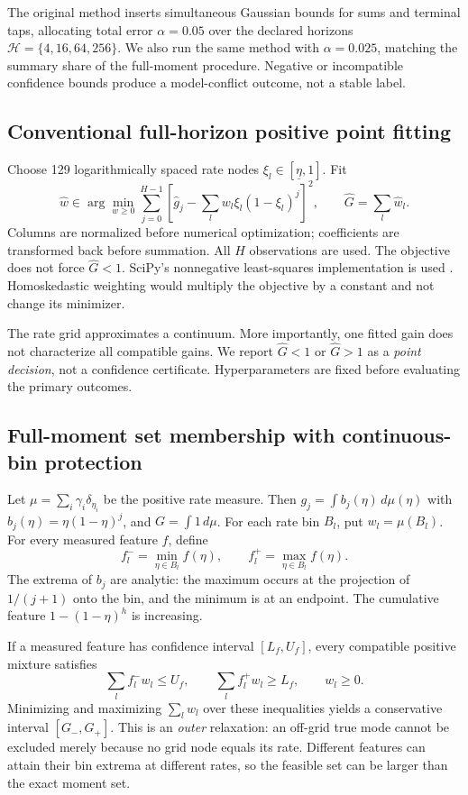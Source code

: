\documentclass[11pt]{article}
\theoremstyle{remark}\newtheorem{remark}[proposition]{Remark}
\begin{document}
The original method inserts simultaneous Gaussian bounds for sums and terminal taps, allocating total error $\alpha=0.05$ over the declared horizons $\mathcal H=\{4,16,64,256\}$. We also run the same method with $\alpha=0.025$, matching the summary share of the full-moment procedure. Negative or incompatible confidence bounds produce a model-conflict outcome, not a stable label.

\subsection{Conventional full-horizon positive point fitting}
Choose 129 logarithmically spaced rate nodes $\xi_l\in[\underline\eta,1]$. Fit
\begin{equation}
 \hat w\in\arg\min_{w\ge0}\sum_{j=0}^{H-1}\left[\hat g_j-\sum_lw_l\xi_l(1-\xi_l)^j\right]^2,\qquad\hat G=\sum_l\hat w_l.\label{eq:nnls}
\end{equation}
Columns are normalized before numerical optimization; coefficients are transformed back before summation. All $H$ observations are used. The objective does not force $\hat G<1$. SciPy's nonnegative least-squares implementation is used \citep{scipy_nnls}. Homoskedastic weighting would multiply the objective by a constant and not change its minimizer.

The rate grid approximates a continuum. More importantly, one fitted gain does not characterize all compatible gains. We report $\hat G<1$ or $\hat G>1$ as a \emph{point decision}, not a confidence certificate. Hyperparameters are fixed before evaluating the primary outcomes.

\subsection{Full-moment set membership with continuous-bin protection}
Let $\mu=\sum_i\gamma_i\delta_{\eta_i}$ be the positive rate measure. Then $g_j=\int b_j(\eta)\,d\mu(\eta)$ with $b_j(\eta)=\eta(1-\eta)^j$, and $G=\int1\,d\mu$. For each rate bin $B_l$, put $w_l=\mu(B_l)$. For every measured feature $f$, define
\begin{equation}
 f_l^- =\min_{\eta\in B_l}f(\eta),\qquad f_l^+=\max_{\eta\in B_l}f(\eta).
\end{equation}
The extrema of $b_j$ are analytic: the maximum occurs at the projection of $1/(j+1)$ onto the bin, and the minimum is at an endpoint. The cumulative feature $1-(1-\eta)^h$ is increasing.

If a measured feature has confidence interval $[L_f,U_f]$, every compatible positive mixture satisfies
\begin{equation}
 \sum_lf_l^-w_l\le U_f,\qquad \sum_lf_l^+w_l\ge L_f,\qquad w_l\ge0.\label{eq:outer}
\end{equation}
Minimizing and maximizing $\sum_lw_l$ over these inequalities yields a conservative interval $[G_-,G_+]$. This is an \emph{outer} relaxation: an off-grid true mode cannot be excluded merely because no grid node equals its rate. Different features can attain their bin extrema at different rates, so the feasible set can be larger than the exact moment set.
\end{document}
